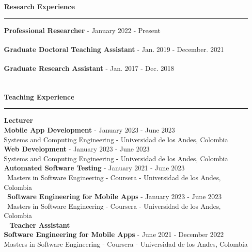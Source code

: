 \documentclass[letterpaper,11pt,oneside]{article}
\begin{document}
\newpage
\noindent \Large{\textbf{Research Experience}} \\
\vspace{-2ex}
\hrule 
\normalsize
\vspace{2ex}
\noindent \indent \textbf{Professional Researcher} - January 2022 - Present\\
 \\
\noindent \indent \textbf{Graduate Doctoral Teaching Assistant} - Jan. 2019 - December. 2021\\
 \\
\noindent \indent \textbf{Graduate Research Assistant} - Jan. 2017 - Dec. 2018\\
 \\
\\
\noindent \Large{\textbf{Teaching Experience}} \\
\vspace{-2ex}
\hrule 
\normalsize
\vspace{2ex}
\noindent \large{\textbf{Lecturer}} \\
\indent \textbf{Mobile App Development} -  January 2023 - June 2023\\
\indent Systems and Computing Engineering - Universidad de los Andes, Colombia \\
\indent \textbf{Web Development} -  January 2023 - June 2023\\
\indent Systems and Computing Engineering - Universidad de los Andes, Colombia \\
\indent \textbf{Automated Software Testing} -  January 2021 - June 2023\\
 \indent Masters in Software Engineering - Coursera - Universidad de los Andes, Colombia \\
 \indent \textbf{Software Engineering for Mobile Apps} -  January 2023 - June 2023\\
 \indent Masters in Software Engineering - Coursera - Universidad de los Andes, Colombia \vspace{0.2cm}\\ 
 \noindent \large{\textbf{Teacher Assistant}}\\
\indent \textbf{Software Engineering for Mobile Apps} - June 2021 - December 2022  \\
\indent Masters in Software Engineering - Coursera - Universidad de los Andes, Colombia \\
\end{document}
